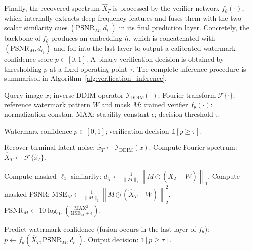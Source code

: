 {Finally, the recovered spectrum $\hat{X}_T$ is processed by the verifier network $f_\theta(\cdot)$, which internally extracts deep frequency-features and fuses them with the two scalar similarity cues $(\mathrm{PSNR}_M, d_{\ell_1})$ in its final prediction layer.
Concretely, the backbone of $f_\theta$ produces an embedding $h$, which is concatenated with $(\mathrm{PSNR}_M, d_{\ell_1})$ and fed into the last layer to output a calibrated watermark confidence score $p \in [0,1]$.
A binary verification decision is obtained by thresholding $p$ at a fixed operating point $\tau$.
The complete inference procedure is summarised in Algorithm~\ref{alg:verification_inference}.

\begin{algorithm}[t]
\caption{Watermark Verification (Inference)}
\label{alg:verification_inference}
\begin{algorithmic}[1]
\Require
Query image $x$;
inverse DDIM operator $\mathcal{I}_{\text{DDIM}}(\cdot)$;
Fourier transform $\mathcal{F}\{\cdot\}$;
reference watermark pattern $W$ and mask $M$;
trained verifier $f_\theta(\cdot)$;
normalization constant $\mathrm{MAX}$;
stability constant $\epsilon$;
decision threshold $\tau$.

\Ensure
Watermark confidence $p \in [0,1]$;
verification decision $\mathbb{1}[p \ge \tau]$.

\State Recover terminal latent noise: $\hat{x}_T \leftarrow \mathcal{I}_{\text{DDIM}}(x)$.
\State Compute Fourier spectrum: $\hat{X}_T \leftarrow \mathcal{F}\{\hat{x}_T\}$.

\State Compute masked $\ell_1$ similarity:
\State \hspace{1.2em} $d_{\ell_1} \leftarrow \frac{1}{\|M\|_1}\left\| M \odot (\hat{X}_T - W) \right\|_1$.
\State Compute masked PSNR:
\State \hspace{1.2em} $\mathrm{MSE}_M \leftarrow \frac{1}{\|M\|_1}\left\| M \odot (\hat{X}_T - W) \right\|_2^2$.
\State \hspace{1.2em} $\mathrm{PSNR}_M \leftarrow 10 \log_{10}\!\left(\frac{\mathrm{MAX}^2}{\mathrm{MSE}_M + \epsilon}\right)$.

\State Predict watermark confidence (fusion occurs in the last layer of $f_\theta$):
\State \hspace{1.2em} $p \leftarrow f_\theta(\hat{X}_T, \mathrm{PSNR}_M, d_{\ell_1})$.
\State Output decision: $\mathbb{1}[p \ge \tau]$.
\end{algorithmic}
\end{algorithm}
}
